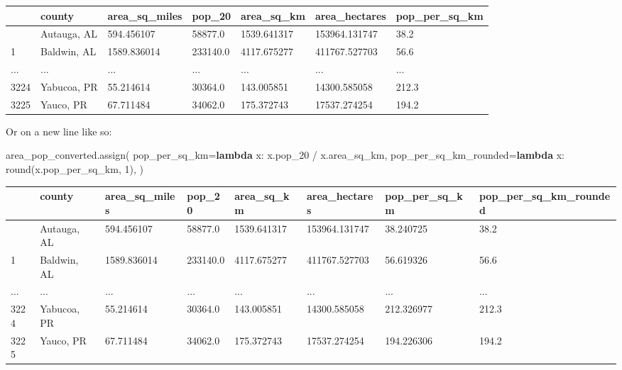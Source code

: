 \documentclass[
  letterpaper,
  DIV=11,
  numbers=noendperiod]{scrreprt}
\newenvironment{Shaded}{\begin{snugshade}}{\end{snugshade}}
\newcommand{\BuiltInTok}[1]{\textcolor[rgb]{0.00,0.23,0.31}{#1}}
\newcommand{\DecValTok}[1]{\textcolor[rgb]{0.68,0.00,0.00}{#1}}
\newcommand{\KeywordTok}[1]{\textcolor[rgb]{0.00,0.23,0.31}{\textbf{#1}}}
\newcommand{\NormalTok}[1]{\textcolor[rgb]{0.00,0.23,0.31}{#1}}
\newcommand{\OperatorTok}[1]{\textcolor[rgb]{0.37,0.37,0.37}{#1}}
\begin{document}
\begin{longtable}[]{@{}lllllll@{}}
\toprule\noalign{}
& county & area\_sq\_miles & pop\_20 & area\_sq\_km & area\_hectares &
pop\_per\_sq\_km \\
\midrule\noalign{}
\endhead
\bottomrule\noalign{}
\endlastfoot
0 & Autauga, AL & 594.456107 & 58877.0 & 1539.641317 & 153964.131747 &
38.2 \\
1 & Baldwin, AL & 1589.836014 & 233140.0 & 4117.675277 & 411767.527703 &
56.6 \\
... & ... & ... & ... & ... & ... & ... \\
3224 & Yabucoa, PR & 55.214614 & 30364.0 & 143.005851 & 14300.585058 &
212.3 \\
3225 & Yauco, PR & 67.711484 & 34062.0 & 175.372743 & 17537.274254 &
194.2 \\
\end{longtable}

Or on a new line like so:

\begin{Shaded}
\begin{Highlighting}[]
\NormalTok{area\_pop\_converted.assign(}
\NormalTok{    pop\_per\_sq\_km}\OperatorTok{=}\KeywordTok{lambda}\NormalTok{ x: x.pop\_20 }\OperatorTok{/}\NormalTok{ x.area\_sq\_km,}
\NormalTok{    pop\_per\_sq\_km\_rounded}\OperatorTok{=}\KeywordTok{lambda}\NormalTok{ x: }\BuiltInTok{round}\NormalTok{(x.pop\_per\_sq\_km, }\DecValTok{1}\NormalTok{),}
\NormalTok{)}
\end{Highlighting}
\end{Shaded}

\begin{longtable}[]{@{}llllllll@{}}
\toprule\noalign{}
& county & area\_sq\_miles & pop\_20 & area\_sq\_km & area\_hectares &
pop\_per\_sq\_km & pop\_per\_sq\_km\_rounded \\
\midrule\noalign{}
\endhead
\bottomrule\noalign{}
\endlastfoot
0 & Autauga, AL & 594.456107 & 58877.0 & 1539.641317 & 153964.131747 &
38.240725 & 38.2 \\
1 & Baldwin, AL & 1589.836014 & 233140.0 & 4117.675277 & 411767.527703 &
56.619326 & 56.6 \\
... & ... & ... & ... & ... & ... & ... & ... \\
3224 & Yabucoa, PR & 55.214614 & 30364.0 & 143.005851 & 14300.585058 &
212.326977 & 212.3 \\
3225 & Yauco, PR & 67.711484 & 34062.0 & 175.372743 & 17537.274254 &
194.226306 & 194.2 \\
\end{longtable}
\end{document}
